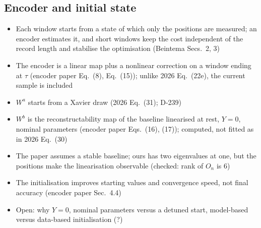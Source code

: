 \subsection{Encoder and initial state}\label{sec:aug_encoder}
\ifdraft
\begin{itemize}
\item Each window starts from a state of which only the positions are measured; an encoder estimates it, and short windows keep the cost independent of the record length and stabilise the optimisation (Beintema Secs.~2, 3)
\item The encoder is a linear map plus a nonlinear correction on a window ending at $\tau$ (encoder paper Eq.~(8), Eq.~(15)); unlike 2026 Eq.~(22e), the current sample is included
\item $W^a$ starts from a Xavier draw (2026 Eq.~(31); D-239)
\item $W^b$ is the reconstructability map of the baseline linearised at rest, $Y=0$, nominal parameters (encoder paper Eqs.~(16), (17)); computed, not fitted as in 2026 Eq.~(30)
\item The paper assumes a stable baseline; ours has two eigenvalues at one, but the positions make the linearisation observable (checked: rank of $O_n$ is 6)
\item The initialisation improves starting values and convergence speed, not final accuracy (encoder paper Sec.~4.4)
\item Open: why $Y=0$, nominal parameters versus a detuned start, model-based versus data-based initialisation (?)
\end{itemize}
\fi

